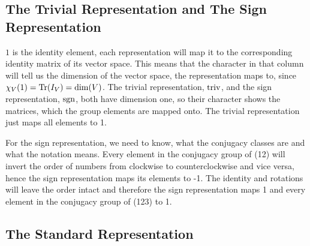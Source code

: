\subsection{The Trivial Representation and The Sign Representation}

$1$ is the identity element, each representation will map it to the corresponding identity matrix of its vector space.
This means that the character in that column will tell us the dimension of the vector space, the representation maps to, since $\chi_V(1) = \operatorname{Tr}(I_V) = \dim(V)$.
The trivial representation, $\operatorname{triv}$, and the sign representation, $\operatorname{sgn}$, both have dimension one, so their character shows the matrices, which the group elements are mapped onto.
The trivial representation just maps all elements to 1.

For the sign representation, we need to know, what the conjugacy classes are and what the notation means.
Every element in the conjugacy group of (12) will invert the order of numbers from clockwise to counterclockwise and vice versa, hence the sign representation maps its elements to -1.
The identity and rotations will leave the order intact and therefore the sign representation maps 1 and every element in the conjugacy group of (123) to 1.

\subsection{The Standard Representation}

